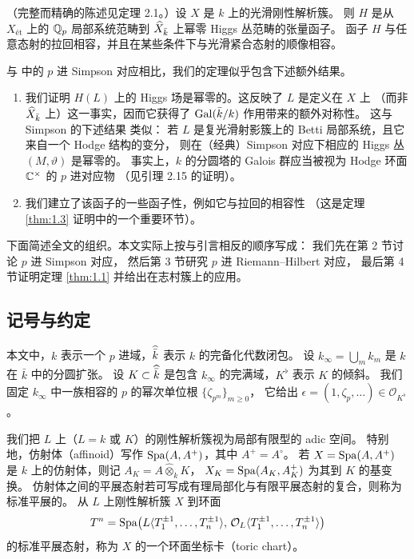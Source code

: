 \begin{thm}\label{thm:1.6}
（完整而精确的陈述见定理 2.1。）设 $X$ 是 $k$ 上的光滑刚性解析簇。
则 $H$ 是从 $X_{\text{\'et}}$ 上的 $\mathbb{Q}_p$ 局部系统范畴到 $\widehat{X}_{\bar k}$ 上幂零 Higgs 丛范畴的张量函子。
函子 $H$ 与任意态射的拉回相容，并且在某些条件下与光滑紧合态射的顺像相容。
\end{thm}

\begin{rmk}\label{rmk:1.10}
与 \cite{Fa,AGT} 中的 $p$ 进 Simpson 对应相比，我们的定理似乎包含下述额外结果。
\begin{enumerate}
\item 我们证明 $H(L)$ 上的 Higgs 场是幂零的。这反映了 $L$ 是定义在 $X$ 上
（而非 $\widehat{X}_{\bar k}$ 上）这一事实，因而它获得了 $\operatorname{Gal}(\bar k/k)$ 作用带来的额外对称性。
这与 Simpson 的下述结果 \cite[Corollary 4.2]{Sim} 类似：
若 $L$ 是复光滑射影簇上的 Betti 局部系统，且它来自一个 Hodge 结构的变分，
则在（经典）Simpson 对应下相应的 Higgs 丛 $(M,\vartheta)$ 是幂零的。
事实上，$k$ 的分圆塔的 Galois 群应当被视为 Hodge 环面 $\mathbb{C}^\times$ 的 $p$ 进对应物
（见引理 2.15 的证明）。
\item 我们建立了该函子的一些函子性，例如它与拉回的相容性
（这是定理 \ref{thm:1.3} 证明中的一个重要环节）。
\end{enumerate}
\end{rmk}

下面简述全文的组织。本文实际上按与引言相反的顺序写成：
我们先在第 2 节讨论 $p$ 进 Simpson 对应，
然后第 3 节研究 $p$ 进 Riemann--Hilbert 对应，
最后第 4 节证明定理 \ref{thm:1.1} 并给出在志村簇上的应用。

\subsection*{记号与约定}

本文中，$k$ 表示一个 $p$ 进域，$\widehat{\bar k}$ 表示 $k$ 的完备化代数闭包。
设 $k_\infty=\bigcup_m k_m$ 是 $k$ 在 $\bar k$ 中的分圆扩张。
设 $K\subset\widehat{\bar k}$ 是包含 $k_\infty$ 的完满域，$K^\flat$ 表示 $K$ 的倾斜。
我们固定 $k_\infty$ 中一族相容的 $p$ 的幂次单位根 $\{\zeta_{p^m}\}_{m\ge 0}$，
它给出 $\epsilon=(1,\zeta_p,\dots)\in\mathcal O_{K^\flat}$。

我们把 $L$ 上（$L=k$ 或 $K$）的刚性解析簇视为局部有限型的 adic 空间。
特别地，仿射体（affinoid）写作 $\operatorname{Spa}(A,A^+)$，其中 $A^+=A^\circ$。
若 $X=\operatorname{Spa}(A,A^+)$ 是 $k$ 上的仿射体，则记 $A_K=A\widehat{\otimes}_k K$，
$X_K=\operatorname{Spa}(A_K,A_K^+)$ 为其到 $K$ 的基变换。
仿射体之间的平展态射若可写成有理局部化与有限平展态射的复合，则称为标准平展的。
从 $L$ 上刚性解析簇 $X$ 到环面
\[
  T^n=\operatorname{Spa}\bigl(L\langle T_1^{\pm 1},\dots,T_n^{\pm 1}\rangle,\,
  \mathcal O_L\langle T_1^{\pm 1},\dots,T_n^{\pm 1}\rangle\bigr)
\]
的标准平展态射，称为 $X$ 的一个环面坐标卡（toric chart）。

